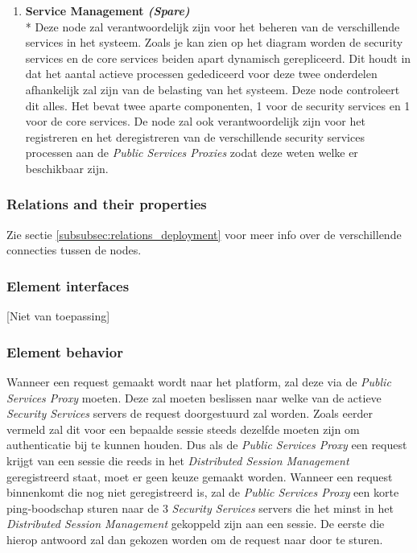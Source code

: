 \documentclass[a4paper,10pt]{article}
\begin{document}
\begin{enumerate}
\item \textbf{Service Management \textit{(Spare)}}\\*
Deze node zal verantwoordelijk zijn voor het beheren van de verschillende services in het systeem. Zoals je kan zien op het diagram worden de security services en de core services beiden apart dynamisch gerepliceerd. Dit houdt in dat het aantal actieve processen gedediceerd voor deze twee onderdelen afhankelijk zal zijn van de belasting van het systeem. Deze node controleert dit alles. Het bevat twee aparte componenten, 1 voor de security services en 1 voor de core services. De node zal ook verantwoordelijk zijn voor het registreren en het deregistreren van de verschillende security services processen aan de \textit{Public Services Proxies} zodat deze weten welke er beschikbaar zijn.

\end{enumerate}


\subsubsection{Relations and their properties}
Zie sectie \ref{subsubsec:relations_deployment} voor meer info over de verschillende connecties tussen de nodes.

\subsubsection{Element interfaces}
[Niet van toepassing]

\subsubsection{Element behavior}
Wanneer een request gemaakt wordt naar het platform, zal deze via de \textit{Public Services Proxy} moeten. Deze zal moeten beslissen naar welke van de actieve \textit{Security Services} servers de request doorgestuurd zal worden. Zoals eerder vermeld zal dit voor een bepaalde sessie steeds dezelfde moeten zijn om authenticatie bij te kunnen houden. Dus als de \textit{Public Services Proxy} een request krijgt van een sessie die reeds in het \textit{Distributed Session Management} geregistreerd staat, moet er geen keuze gemaakt worden. Wanneer een request binnenkomt die nog niet geregistreerd is, zal de \textit{Public Services Proxy} een korte ping-boodschap sturen naar de 3 \textit{Security Services} servers die het minst in het \textit{Distributed Session Management} gekoppeld zijn aan een sessie. De eerste die hierop antwoord zal dan gekozen worden om de request naar door te sturen.
\end{document}
